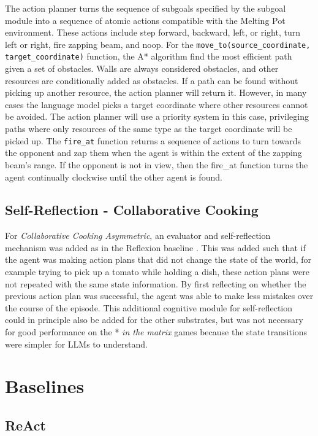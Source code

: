 \documentclass{article} %
\begin{document}
The action planner turns the sequence of subgoals specified by the subgoal module into a sequence of atomic actions compatible with the Melting Pot environment. These actions include step forward, backward, left, or right, turn left or right, fire zapping beam, and noop. For the \texttt{move\_to(source\_coordinate, target\_coordinate)} function, the A* algorithm find the most efficient path given a set of obstacles. Walls are always considered obstacles, and other resources are conditionally added as obstacles. If a path can be found without picking up another resource, the action planner will return it. However, in many cases the language model picks a target coordinate where other resources cannot be avoided. The action planner will use a priority system in this case, privileging paths where only resources of the same type as the target coordinate will be picked up. The \texttt{fire\_at} function returns a sequence of actions to turn towards the opponent and zap them when the agent is within the extent of the zapping beam's range. If the opponent is not in view, then the fire\_at function turns the agent continually clockwise until the other agent is found.

\subsection{Self-Reflection - Collaborative Cooking}

For \textit{Collaborative Cooking Asymmetric}, an evaluator and self-reflection mechanism was added as in the Reflexion baseline \citep{shinn2024reflexion}. This was added such that if the agent was making action plans that did not change the state of the world, for example trying to pick up a tomato while holding a dish, these action plans were not repeated with the same state information. By first reflecting on whether the previous action plan was successful, the agent was able to make less mistakes over the course of the episode. This additional cognitive module for self-reflection could in principle also be added for the other substrates, but was not necessary for good performance on the *\textit{ in the matrix} games because the state transitions were simpler for LLMs to understand.

\section{Baselines}

\subsection{ReAct}
\end{document}
